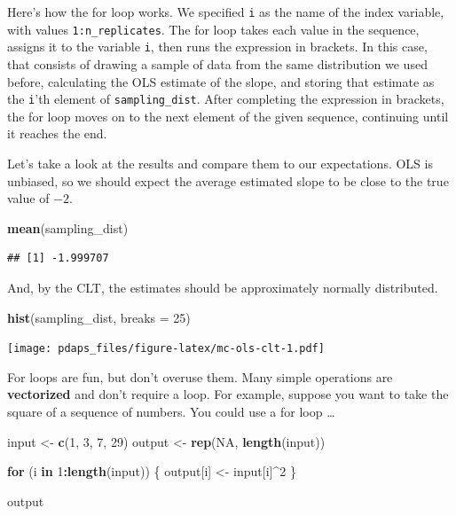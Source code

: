 \documentclass[
  12pt,
  oneside,openany]{book}
\newenvironment{Shaded}{\begin{snugshade}}{\end{snugshade}}
\newcommand{\ControlFlowTok}[1]{\textcolor[rgb]{0.13,0.29,0.53}{\textbf{#1}}}
\newcommand{\DataTypeTok}[1]{\textcolor[rgb]{0.13,0.29,0.53}{#1}}
\newcommand{\DecValTok}[1]{\textcolor[rgb]{0.00,0.00,0.81}{#1}}
\newcommand{\KeywordTok}[1]{\textcolor[rgb]{0.13,0.29,0.53}{\textbf{#1}}}
\newcommand{\NormalTok}[1]{#1}
\newcommand{\OperatorTok}[1]{\textcolor[rgb]{0.81,0.36,0.00}{\textbf{#1}}}
\newcommand{\OtherTok}[1]{\textcolor[rgb]{0.56,0.35,0.01}{#1}}
\newcommand{\StringTok}[1]{\textcolor[rgb]{0.31,0.60,0.02}{#1}}
\begin{document}
Here's how the for loop works.
We specified \texttt{i} as the name of the index variable, with values \texttt{1:n\_replicates}.
The for loop takes each value in the sequence, assigns it to the variable \texttt{i}, then runs the expression in brackets.
In this case, that consists of drawing a sample of data from the same distribution we used before, calculating the OLS estimate of the slope, and storing that estimate as the \texttt{i}'th element of \texttt{sampling\_dist}.
After completing the expression in brackets, the for loop moves on to the next element of the given sequence, continuing until it reaches the end.

Let's take a look at the results and compare them to our expectations.
OLS is unbiased, so we should expect the average estimated slope to be close to the true value of \(-2\).

\begin{Shaded}
\begin{Highlighting}[]
\KeywordTok{mean}\NormalTok{(sampling\_dist)}
\end{Highlighting}
\end{Shaded}

\begin{verbatim}
## [1] -1.999707
\end{verbatim}

And, by the CLT, the estimates should be approximately normally distributed.

\begin{Shaded}
\begin{Highlighting}[]
\KeywordTok{hist}\NormalTok{(sampling\_dist, }\DataTypeTok{breaks =} \DecValTok{25}\NormalTok{)}
\end{Highlighting}
\end{Shaded}

\texttt{[image: pdaps\_files/figure-latex/mc-ols-clt-1.pdf]}

For loops are fun, but don't overuse them. Many simple operations are \textbf{vectorized} and don't require a loop. For example, suppose you want to take the square of a sequence of numbers. You could use a for loop \ldots{}

\begin{Shaded}
\begin{Highlighting}[]
\NormalTok{input \textless{}{-}}\StringTok{ }\KeywordTok{c}\NormalTok{(}\DecValTok{1}\NormalTok{, }\DecValTok{3}\NormalTok{, }\DecValTok{7}\NormalTok{, }\DecValTok{29}\NormalTok{)}
\NormalTok{output \textless{}{-}}\StringTok{ }\KeywordTok{rep}\NormalTok{(}\OtherTok{NA}\NormalTok{, }\KeywordTok{length}\NormalTok{(input))}

\ControlFlowTok{for}\NormalTok{ (i }\ControlFlowTok{in} \DecValTok{1}\OperatorTok{:}\KeywordTok{length}\NormalTok{(input)) \{}
\NormalTok{  output[i] \textless{}{-}}\StringTok{ }\NormalTok{input[i]}\OperatorTok{\^{}}\DecValTok{2}
\NormalTok{\}}

\NormalTok{output}
\end{Highlighting}
\end{Shaded}
\end{document}

